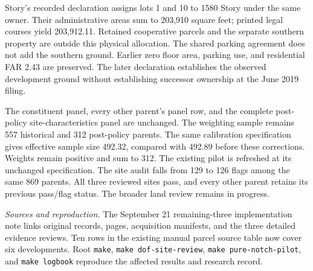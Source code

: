 Story's recorded declaration assigns lots 1 and 10 to 1580 Story under the
same owner. Their administrative areas sum to 203,910 square feet; printed
legal courses yield 203,912.11. Retained cooperative parcels and the separate
southern property are outside this physical allocation. The shared parking
agreement does not add the southern ground. Earlier zero floor area, parking
use, and residential FAR 2.43 are preserved. The later declaration establishes
the observed development ground without establishing successor ownership at
the June 2019 filing.

The constituent panel, every other parent's panel row, and the complete
post-policy site-characteristics panel are unchanged. The weighting sample
remains 557 historical and 312 post-policy parents. The same calibration
specification gives effective sample size 492.32, compared with 492.89 before
these corrections. Weights remain positive and sum to 312. The existing pilot
is refreshed at its unchanged specification. The site audit falls from 129
to 126 flags among the same 869 parents. All three reviewed sites pass, and
every other parent retains its previous pass/flag status. The broader land
review remains in progress.

\textit{Sources and reproduction.} The September 21 remaining-three
implementation note links original records, pages, acquisition manifests, and
the three detailed evidence reviews. Ten rows in the existing manual parcel
source table now cover six developments. Root \texttt{make},
\texttt{make dof-site-review}, \texttt{make pure-notch-pilot}, and
\texttt{make logbook} reproduce the affected results and research record.
